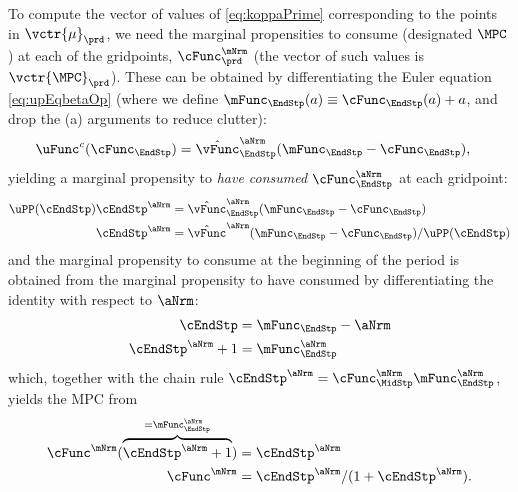 \documentclass[\econtexRoot/SolvingMicroDSOPs]{subfiles}
\begin{document}
To compute the vector of values of \eqref{eq:koppaPrime} corresponding
to the points in $\vctr{\mu}_{\prd}$, we need the marginal propensities to
consume (designated $\MPC$) at each of the gridpoints,
$\cFunc^{\mNrm}_{\prd}$ (the vector of such values is
$\vctr{\MPC}_{\prd}$).  These can be obtained by differentiating the
Euler equation \eqref{eq:upEqbetaOp} (where we define
$\mFunc_{\EndStp}(a) \equiv \cFunc_{\EndStp}(a)+{a}$, and drop the (a) arguments to reduce clutter):
\begin{equation}\begin{gathered}\begin{aligned}
      \uFunc^{c}(\cFunc_{\EndStp})   & = \hat{\vFunc}_{\EndStp}^{\aNrm}(\mFunc_{\EndStp}-\cFunc_{\EndStp}),
    \end{aligned}\end{gathered}\end{equation}
yielding a marginal propensity to
\textit{have consumed} $\cFunc_{\EndStp}^{\aNrm}$ at each gridpoint:
\begin{equation}\begin{gathered}\begin{aligned}
      \uPP(\cEndStp)\cEndStp^\aNrm  & = \hat{\vFunc}_{\EndStp}^{\aNrm}(\mFunc_{\EndStp}-\cFunc_{\EndStp})
      \\ \cEndStp^\aNrm  & = \hat{\vFunc}^{\aNrm}(\mFunc_{\EndStp}-\cFunc_{\EndStp})/\uPP(\cEndStp)
    \end{aligned}\end{gathered}\end{equation}
and the marginal propensity to consume at the beginning of the period is obtained from the marginal propensity to have consumed by differentiating the identity with respect to $\aNrm$:
\begin{equation*}\begin{gathered}\begin{aligned}
      \cEndStp  & = \mFunc_{\EndStp} - \aNrm
      \\ \cEndStp^{\aNrm}+1  & = \mFunc_{\EndStp}^{\aNrm}
    \end{aligned}\end{gathered}\end{equation*}
which, together with the chain rule $\cEndStp^\aNrm  = \cFunc^{\mNrm}_{\MidStp}\mFunc_{\EndStp}^{\aNrm}$, yields the MPC from
\begin{equation}\begin{gathered}\begin{aligned}
      \cFunc^{\mNrm}(\overbrace{\cEndStp^{\aNrm}+1}^{=\mFunc_{\EndStp}^{\aNrm}})  & = \cEndStp^{\aNrm}
      \\ \cFunc^\mNrm  & = \cEndStp^{\aNrm}/(1+\cEndStp^{\aNrm}) \label{eq:MPCfromMPTHC}.
    \end{aligned}\end{gathered}\end{equation}
\end{document}
